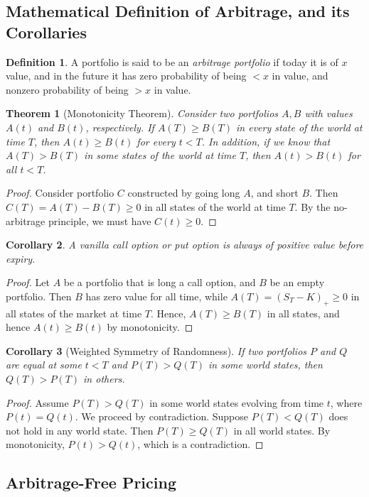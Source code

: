\documentclass[12pt]{article}
\theoremstyle{plain}
\newtheorem{theorem}{Theorem}
\newtheorem{corollary}[theorem]{Corollary}
\theoremstyle{definition}
\newtheorem*{definition}{Definition}
\theoremstyle{remark}
\numberwithin{equation}{section}  %
\begin{document}
\subsection{Mathematical Definition of Arbitrage, and its Corollaries}
\begin{definition}
	A portfolio is said to be an \emph{arbitrage portfolio} if today it is
	of $x$ value, and in the future it has zero probability of being $<x$ in 
	value,
	and nonzero probability of being $>x$ in value. 
\end{definition}
\begin{theorem}[Monotonicity Theorem]
	Consider two portfolios $A, B$ with values $A(t)$ and $B(t)$, respectively. 
	If $A(T) \ge B(T)$ in every state of the world at time $T$, then
	$A(t) \ge B(t)$ for every $t < T$. In addition, if we know that
	$A(T) > B(T)$ in some states of the world at time $T$, then
	$A(t) > B(t)$ for all $t < T$. 
\end{theorem}
\begin{proof}
	Consider portfolio $C$ constructed by going long $A$, and short $B$. Then
	$C(T) = A(T) - B(T) \ge 0$ in all states of the world at time $T$. 
	By the no-arbitrage principle, we must have $C(t) \ge 0$. \qedhere
\end{proof}
\begin{corollary}
	A vanilla call option or put option is always of positive value before 
	expiry.
\end{corollary}
\begin{proof}
	Let $A$ be a portfolio that is long a call option, and $B$ be an empty
	portfolio.  Then $B$ has zero value for all time, while $A(T) = {(S_{T}
		- K)}_{+} \ge 0$ in all states of the market at time $T$. Hence, $A(T) \ge
	B(T)$ in all states, and hence $A(t) \ge B(t)$ by monotonicity.
\end{proof}
\begin{corollary}[Weighted Symmetry of Randomness]
	If two portfolios $P$ and $Q$ are equal at some $t < T$ and $P(T) > Q(T)$
	in some world states, then $Q(T) > P(T)$ in others. 
\end{corollary}
\begin{proof}
	Assume $P(T) > Q(T)$ in some world states evolving from time $t$, where
	$P(t) = Q(t)$. We proceed by contradiction. Suppose $P(T) < Q(T)$ does not 
	hold
	in any world state. Then $P(T) \ge Q(T)$ in all world states. By 
	monotonicity,
	$P(t) > Q(t)$, which is a contradiction.
\end{proof}
\subsection{Arbitrage-Free Pricing}
\end{document}
